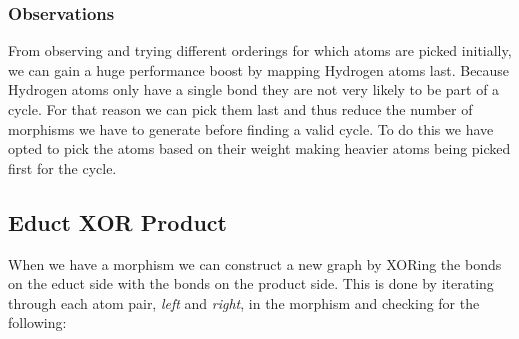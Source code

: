 \documentclass{article}
\begin{document}
\subsubsection{Observations}
From observing and trying different orderings for which atoms are picked initially, we can gain a huge performance boost by mapping Hydrogen atoms last. Because Hydrogen atoms only have a single bond they are not very likely to be part of a cycle. For that reason we can pick them last and thus reduce the number of morphisms we have to generate before finding a valid cycle. To do this we have opted to pick the atoms based on their weight making heavier atoms being picked first for the cycle.

\subsection{Educt XOR Product}
When we have a morphism we can construct a new graph by XORing the bonds on the educt side with the bonds on the product side. This is done by iterating through each atom pair, \textit{left} and \textit{right}, in the morphism and checking for the following:
\end{document}
